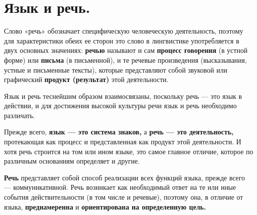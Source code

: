 \section{Язык и речь.}

Слово «речь» обозначает специфическую человеческую деятельность, поэтому для характеристики обеих ее сторон это слово в лингвистике употребляется в двух основных значениях: \textbf{речью} называют и сам \textbf{процесс говорения} (в устной форме) или \textbf{письма} (в письменной), и те речевые произведения (высказывания, устные и письменные тексты), которые представляют собой звуковой или графический \textbf{продукт (результат)} этой деятельности.

Язык и речь теснейшим образом взаимосвязаны, поскольку речь --- это язык в действии, и для достижения высокой культуры речи язык и речь необходимо различать.

Прежде всего, \textbf{язык --- это система знаков,} а \textbf{речь --- это деятельность,} протекающая как процесс и представленная как продукт этой деятельности.
И хотя речь строится на том или ином языке, это самое главное отличие, которое по различным основаниям определяет и другие.

\textbf{Речь} представляет собой способ реализации всех функций языка, прежде всего --- коммуникативной.
Речь возникает как необходимый ответ на те или иные события действительности (в том числе и речевые), поэтому она, в отличие от языка, \textbf{преднамеренна} и \textbf{ориентирована на определенную цель.}

